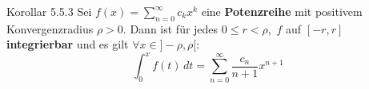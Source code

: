 \documentclass[landscape, 10pt]{article}
\newcommand{\R}{\mathbb{R}}
\begin{document}
\begin{multicols}{3}
              \colorbox{BurntOrange}{Korollar 5.5.3} 
                     Sei \textcolor{NavyBlue}{
                     $f(x)=\sum_{n=0}^\infty c_kx^k$} 
                     eine \textbf{Potenzreihe} 
                     mit positivem Konvergenzradius 
                     \textcolor{NavyBlue}{$\rho>0$}. 
                     Dann ist für jedes 
                     \textcolor{NavyBlue}{$0\leqslant r<\rho$},\,
                     \textcolor{NavyBlue}{$f$} 
                     auf \textcolor{NavyBlue}{$[-r,r]$}
                     \textbf{integrierbar} und es gilt 
                     \textcolor{NavyBlue}{
                     $\forall x\in]-\rho,\rho[$}:
                     \begin{equation*}
                            \int_0^xf(t)\,dt
                            =\sum_{n=0}^
                            \infty\frac{c_n}{n+1}x^{n+1}
                     \end{equation*}

\end{multicols}
\end{document}
